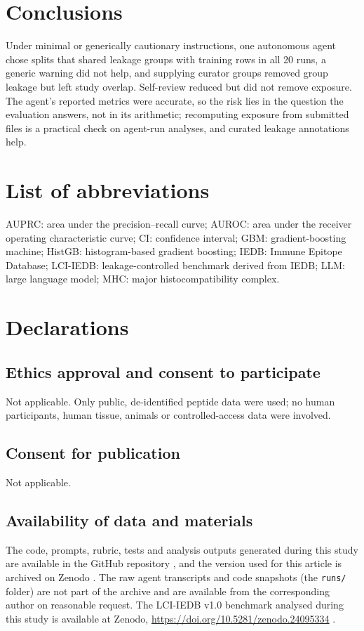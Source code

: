 \documentclass[11pt,a4paper]{article}
\begin{document}
\section*{Conclusions}
Under minimal or generically cautionary instructions, one autonomous agent chose splits that shared leakage groups with training rows in all 20 runs, a generic warning did not help, and supplying curator groups removed group leakage but left study overlap. Self-review reduced but did not remove exposure. The agent's reported metrics were accurate, so the risk lies in the question the evaluation answers, not in its arithmetic; recomputing exposure from submitted files is a practical check on agent-run analyses, and curated leakage annotations help.

\section*{List of abbreviations}
\noindent AUPRC: area under the precision--recall curve; AUROC: area under the receiver operating characteristic curve; CI: confidence interval; GBM: gradient-boosting machine; HistGB: histogram-based gradient boosting; IEDB: Immune Epitope Database; LCI-IEDB: leakage-controlled benchmark derived from IEDB; LLM: large language model; MHC: major histocompatibility complex.

\section*{Declarations}

\subsection*{Ethics approval and consent to participate}
Not applicable. Only public, de-identified peptide data were used; no human participants, human tissue, animals or controlled-access data were involved.

\subsection*{Consent for publication}
Not applicable.

\subsection*{Availability of data and materials}
The code, prompts, rubric, tests and analysis outputs generated during this study are available in the GitHub repository \cite{Repo}, and the version used for this article is archived on Zenodo \cite{Zenodo}. The raw agent transcripts and code snapshots (the \texttt{runs/} folder) are not part of the archive and are available from the corresponding author on reasonable request. The LCI-IEDB v1.0 benchmark analysed during this study is available at Zenodo, \url{https://doi.org/10.5281/zenodo.24095334} \cite{LCIIEDB}.
\end{document}
